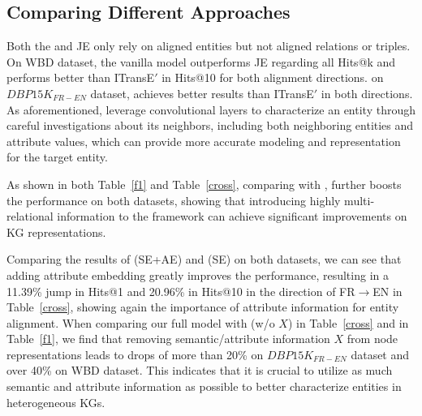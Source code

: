 \subsection{Comparing Different Approaches\label{sec:analysis}}




 Both the \GCN and JE only rely on aligned entities but not aligned relations or triples.  On WBD
dataset, the vanilla \GCN model outperforms JE regarding all Hits@k and performs better than ITransE$'$ in Hits@10 for both alignment
directions. on $DBP15K_{FR-EN}$ dataset, \GCN achieves better results than ITransE$'$ in both directions. As aforementioned, \GCNs leverage
convolutional layers to characterize an entity through careful investigations about its neighbors, including both neighboring entities and
attribute values, which can provide more accurate modeling and representation for the target entity.

 As shown in both Table~\ref{f1} and Table~\ref{cross}, comparing with \GCN, \RGCN further boosts the
performance on both datasets, showing that introducing highly multi-relational information to the \GCN framework can achieve significant
improvements on KG representations.


Comparing the results of \HRGCN (SE+AE) and \HRGCN (SE) on both datasets, we can see that adding attribute embedding greatly improves the performance, resulting in a 11.39\% jump in Hits@1 and 20.96\% in Hits@10 in the direction of FR$\rightarrow$EN in Table~\ref{cross}, showing again the importance of attribute information for entity alignment.
When comparing our full model \HRGCN with \HRGCN (w/o $X$) in Table~\ref{cross} and in Table~\ref{f1}, we find that removing semantic/attribute information $X$ from node representations leads to drops of more than 20\% on $DBP15K_{FR-EN}$ dataset and over 40\% on WBD dataset. This indicates that it is crucial to utilize
as much semantic and attribute information as possible to better characterize entities in heterogeneous KGs.


